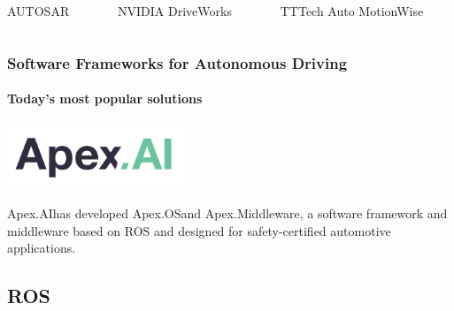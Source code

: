 \begin{frame}
\begin{columns}[]
\begin{column}{0.33\textwidth}
        AUTOSAR\footnotemark[4]
    \end{column}
    \begin{column}{0.33\textwidth}
        \centering
        \footnotesize
        NVIDIA DriveWorks\footnotemark[5]
    \end{column}
    \begin{column}{0.33\textwidth}
        \centering
        \footnotesize
        TTTech Auto MotionWise\footnotemark[6]
    \end{column}
\end{columns}
\end{frame}

\begin{frame}
\frametitle{Software Frameworks for Autonomous Driving}
\framesubtitle{Today's most popular solutions}
\begin{center}
    \includegraphics[width=0.4\textwidth]{images/logo_apexai.png}
\end{center}
\vspace{0.25cm}
Apex.AI\footnotemark[1] has developed Apex.OS\footnotemark[2] and
Apex.Middleware\footnotemark[3], a software framework and
middleware based on ROS and designed for safety-certified automotive
applications.
\end{frame}

\subsection{ROS}

